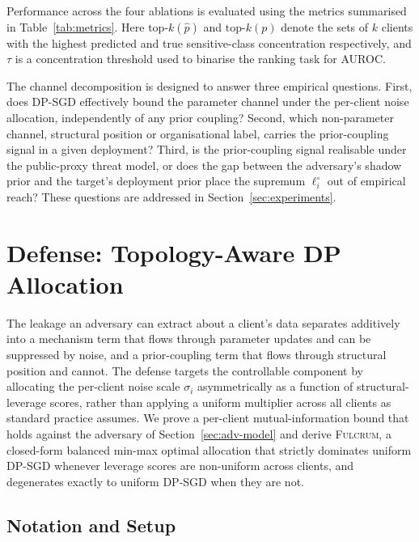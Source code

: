 \documentclass[letterpaper,journal]{IEEEtran}
\newcommand{\Fulcrum}{\textsc{Fulcrum}\xspace}
\begin{document}
Performance across the four ablations is evaluated using the metrics
summarised in Table~\ref{tab:metrics}. Here $\text{top-}k(\hat{p})$
and $\text{top-}k(p)$ denote the sets of $k$ clients with the
highest predicted and true sensitive-class concentration
respectively, and $\tau$ is a concentration threshold used to
binarise the ranking task for AUROC.

The channel decomposition is designed to answer three empirical
questions. First, does DP-SGD effectively bound the parameter
channel under the per-client noise allocation, independently of any
prior coupling? Second, which non-parameter channel, structural
position or organisational label, carries the prior-coupling signal
in a given deployment? Third, is the prior-coupling signal
realisable under the public-proxy threat model, or does the gap
between the adversary's shadow prior and the target's deployment
prior place the supremum $\ell_i^\circ$ out of empirical reach?
These questions are addressed in Section~\ref{sec:experiments}.

\section{Defense: Topology-Aware DP Allocation}
\label{sec:defense}

The leakage an adversary can extract about a client's data separates
additively into a mechanism term that flows through parameter updates
and can be suppressed by noise, and a prior-coupling term that flows
through structural position and cannot. The defense targets the
controllable component by allocating the per-client noise scale
$\sigma_i$ asymmetrically as a function of structural-leverage
scores, rather than applying a uniform multiplier across all clients
as standard practice assumes. We prove a per-client
mutual-information bound that holds against the adversary of
Section~\ref{sec:adv-model} and derive \Fulcrum, a closed-form
balanced min-max optimal allocation that strictly dominates uniform
DP-SGD whenever leverage scores are non-uniform across clients, and
degenerates exactly to uniform DP-SGD when they are not.

\subsection{Notation and Setup}
\label{sec:defense-setup}
\end{document}
